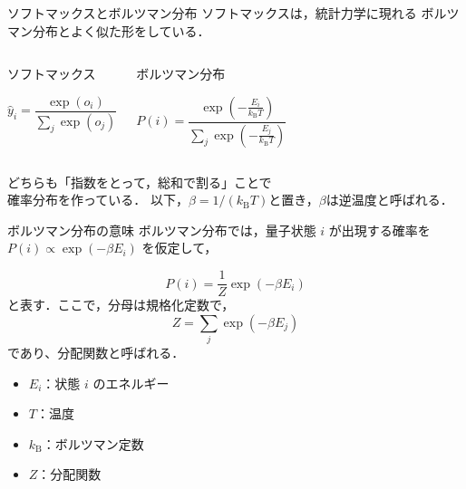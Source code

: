\documentclass[dvipdfmx,uplatex,11pt]{beamer}
\begin{document}


\begin{frame}{ソフトマックスとボルツマン分布}
ソフトマックスは，統計力学に現れる
\alert{ボルツマン分布}とよく似た形をしている．

\vspace{0.5em}

\begin{columns}[T]
\begin{block}{ソフトマックス}

\[
\hat{y}_i
=
\frac{\exp(o_i)}
{\sum_j \exp(o_j)}
\]
\end{block}

\begin{block}{ボルツマン分布}

\[
P(i)
=
\frac{\exp\left(-\frac{E_i}{k_{\mathrm{B}}T}\right)}
{\sum_j \exp\left(-\frac{E_j}{k_{\mathrm{B}}T}\right)}
\]
\end{block}
\end{columns}

\vspace{1em}
\centering
どちらも「指数をとって，総和で割る」ことで\\
\alert{確率分布}を作っている．
以下，$\beta = 1/(k_{\mathrm{B}}T)$と置き，$\beta$は逆温度と呼ばれる．
\end{frame}

\begin{frame}{ボルツマン分布の意味}
ボルツマン分布では，量子状態 $i$ が出現する確率を$P(i) \propto \exp(-\beta E_i)$ を仮定して，

\[
P(i)
=
\frac{1}{Z} \exp(-\beta E_i)
\]
と表す．ここで，分母は規格化定数で，
\[
Z
=
\sum_j \exp\left(- \beta E_j\right)
\]
であり、分配関数と呼ばれる．



\begin{itemize}
  \item $E_i$：状態 $i$ のエネルギー
  \item $T$：温度
  \item $k_{\mathrm{B}}$：ボルツマン定数
  \item $Z$：分配関数
\end{itemize}




\end{frame}
\end{document}
